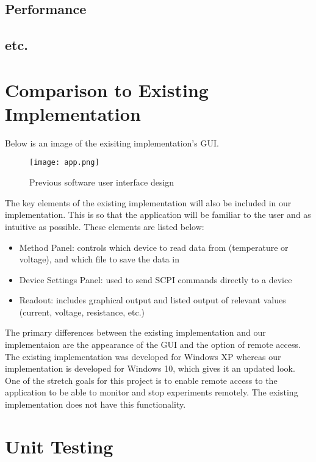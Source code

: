 \documentclass[12pt, titlepage]{article}
\begin{document}
\subsection{Performance}

\subsection{etc.}
	

\section{Comparison to Existing Implementation}	

\noindent Below is an image of the exisiting implementation's GUI.

\begin{figure}[H]
\centerline{\texttt{[image: app.png]}}
\caption{Previous software user interface design}
\label{fig}
\end{figure}

\noindent The key elements of the existing implementation will also be included in our implementation. This is so that the application will be familiar to the user and as intuitive as possible. These elements are listed below:
\begin{itemize}
  \item Method Panel: controls which device to read data from (temperature or voltage), and which file to save the data in
  \item Device Settings Panel: used to send SCPI commands directly to a device
  \item Readout: includes graphical output and listed output of relevant values (current, voltage, resistance, etc.)
\end{itemize}

\noindent The primary differences between the existing implementation and our implementaion are the appearance of the GUI and the option of remote access. The existing implementation was developed for Windows XP whereas our implementation is developed for Windows 10, which gives it an updated look. One of the stretch goals for this project is to enable remote access to the application to be able to monitor and stop experiments remotely. The existing implementation does not have this functionality.\\


\section{Unit Testing}
\end{document}
